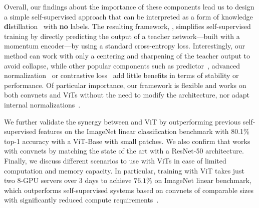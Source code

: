 Overall, our findings about the importance of these components lead us to design a simple self-supervised approach that can be interpreted as a form of knowledge \textbf{di}stillation~\cite{hinton2015distilling} with \textbf{no} labels.
The resulting framework, \OURS, simplifies self-supervised training by directly predicting the output of a teacher network---built with a momentum encoder---by using a standard cross-entropy loss.
Interestingly, our method can work with only a centering and sharpening of the teacher output to avoid collapse, while
other popular components such as predictor~\cite{grill2020bootstrap}, advanced normalization~\cite{caron2020unsupervised} or contrastive loss~\cite{he2020momentum} add little benefits in terms of stability or performance.
Of particular importance, our framework is flexible and works on both convnets and ViTs without the need to modify the architecture, nor adapt internal normalizations~\cite{richemond2020byol}. 

We further validate the synergy between \OURS and ViT by outperforming previous self-supervised features on the ImageNet linear classification benchmark with 80.1\% top-1 accuracy with a ViT-Base with small patches.
We also confirm that \OURS works with convnets by matching the state of the art with a ResNet-50 architecture.
Finally, we discuss different scenarios to use \OURS with ViTs in case of limited computation and memory capacity. 
In particular, training \OURS with ViT takes just two 8-GPU servers over 3 days to achieve $76.1\%$ on ImageNet linear benchmark, which outperforms self-supervised systems based on convnets of comparable sizes with significantly reduced compute requirements~\cite{caron2020unsupervised,grill2020bootstrap}.

